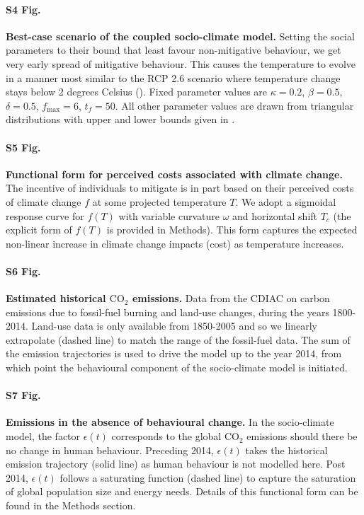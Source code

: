 \documentclass[10pt,letterpaper]{article}
\begin{document}
\paragraph*{S4 Fig.}
\label{S4_fig}
\textbf{Best-case scenario of the coupled socio-climate model.} Setting the social parameters to their bound that least favour non-mitigative behaviour, we get very early spread of mitigative behaviour. This causes the temperature to evolve in a manner most similar to the RCP 2.6 scenario where temperature change stays below 2 degrees Celsius (). Fixed parameter values are $\kappa = 0.2$, $\beta=0.5$, $\delta=0.5$, $f_{\text{max}}=6$, $t_f=50$. All other parameter values are drawn from triangular distributions with upper and lower bounds given in .

\paragraph*{S5 Fig.}
\label{S5_fig}
\textbf{Functional form for perceived costs associated with climate change.} The incentive of individuals to mitigate is in part based on their perceived costs of climate change $f$ at some projected temperature $T$. We adopt a sigmoidal response curve for $f(T)$ with variable curvature $\omega$ and horizontal shift $T_c$ (the explicit form of $f(T)$ is provided in Methods). This form captures the expected non-linear increase in climate change impacts (cost) as temperature increases.

\paragraph*{S6 Fig.}
\label{S6_fig}
\textbf{Estimated historical $\text{CO}_2$ emissions.} Data from the CDIAC on carbon emissions due to fossil-fuel burning and land-use changes, during the years 1800-2014. Land-use data is only available from 1850-2005 and so we linearly extrapolate (dashed line) to match the range of the fossil-fuel data. The sum of the emission trajectories is used to drive the model up to the year 2014, from which point the behavioural component of the socio-climate model is initiated.

\paragraph*{S7 Fig.}
\label{S7_fig}
\textbf{Emissions in the absence of behavioural change.} In the socio-climate model, the factor $\epsilon(t)$ corresponds to the global $\text{CO}_2$ emissions should there be no change in human behaviour. Preceding 2014, $\epsilon(t)$ takes the historical emission trajectory (solid line) as human behaviour is not modelled here. Post 2014, $\epsilon(t)$ follows a saturating function (dashed line) to capture the saturation of global population size and energy needs. Details of this functional form can be found in the Methods section.
\end{document}
